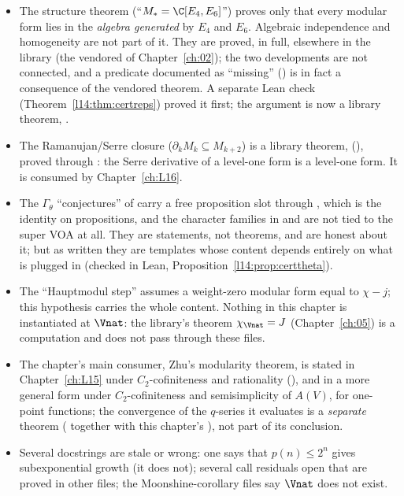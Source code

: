 \begin{itemize}
\item The structure theorem  (``$M_* = \C[E_4,E_6]$'') proves only that every modular form lies
  in the \emph{algebra generated} by $E_4$ and $E_6$. Algebraic independence and homogeneity are not part of it. They are
  proved, in full, elsewhere in the library (the vendored  of
  Chapter~\ref{ch:02}); the two developments are not connected, and a predicate documented as ``missing''
  () is in fact a consequence of the vendored theorem. A separate Lean check
  (Theorem~\ref{l14:thm:certreps}) proved it first; the argument is now a library theorem,
  .
\item The Ramanujan/Serre closure  ($\partial_k M_k\subseteq M_{k+2}$) is a library theorem,
   (), proved through
  : the Serre derivative of a level-one form is a level-one form. It is consumed by Chapter~\ref{ch:L16}.
\item The $\Gamma_\theta$ ``conjectures'' of  carry a free proposition slot
   through , which is the identity on propositions, and the character families in
   and  are not tied to the super VOA at all. They are statements, not
  theorems, and are honest about it; but as written they are templates whose content depends entirely on what is plugged in
  (checked in Lean, Proposition~\ref{l14:prop:certtheta}).
\item The ``Hauptmodul step''  assumes a weight-zero modular form equal to $\chi - j$;
  this hypothesis carries the whole content. Nothing in this chapter is instantiated at $\Vnat$: the library's theorem
  $\chi_{\Vnat} = J$ (Chapter~\ref{ch:05}) is a computation and does not pass through these files.
\item The chapter's main consumer, Zhu's modularity theorem, is stated in Chapter~\ref{ch:L15} under $C_2$-cofiniteness and
  rationality (), and in a more general form under $C_2$-cofiniteness and semisimplicity of $A(V)$, for
  one-point functions; the convergence of the $q$-series it evaluates is a \emph{separate} theorem
  ( together with this chapter's ), not part of its conclusion.
\item Several docstrings are stale or wrong: one says that $p(n)\le 2^n$ gives subexponential growth (it does not); several
  call residuals open that are proved in other files; the Moonshine-corollary files say $\Vnat$ does not exist.
\end{itemize}

